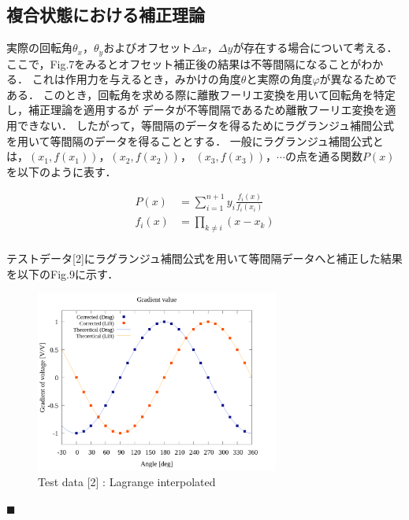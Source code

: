 \documentclass[twocolumn,a4j]{jsarticle}
\begin{document}
\subsection{複合状態における補正理論}

実際の回転角$\theta_x$，$\theta_y$およびオフセット$\Delta x$，$\Delta y$が存在する場合について考える．
ここで，Fig.7をみるとオフセット補正後の結果は不等間隔になることがわかる．
これは作用力を与えるとき，みかけの角度$\theta$と実際の角度$\varphi$が異なるためである．
このとき，回転角を求める際に離散フーリエ変換を用いて回転角を特定し，補正理論を適用するが
データが不等間隔であるため離散フーリエ変換を適用できない．
したがって，等間隔のデータを得るためにラグランジュ補間公式を用いて等間隔のデータを得ることとする．
一般にラグランジュ補間公式とは，$(x_1,f\left(x_1\right))$，$(x_2,f\left(x_2\right))$，
$(x_3,f \left(x_3\right))$，$\cdots$の点を通る関数$P\left(x\right)$を以下のように表す．

\begin{align*}
    P\left(x\right)    & = \sum^{n+1}_{i=1} y_i \frac{f_i\left(x\right)}{f_i \left(x_i\right)} \\
    f_i \left(x\right) & = \prod_{k \neq i} \left(x - x_k\right)\\
\end{align*}

テストデータ[2]にラグランジュ補間公式を用いて等間隔データへと補正した結果を以下のFig.9に示す．

\begin{figure}[htbp]
    \begin{center}
        \includegraphics[width=80mm]{../../../02_workspace/result/offset_dx=10.0_dy=5.0/plot/21/21-3_summary_interpolated.png}
        \caption{Test data [2] : Lagrange interpolated}
    \end{center}
\end{figure}

\newpage

\noindent $\blacksquare$ 
\end{document}
